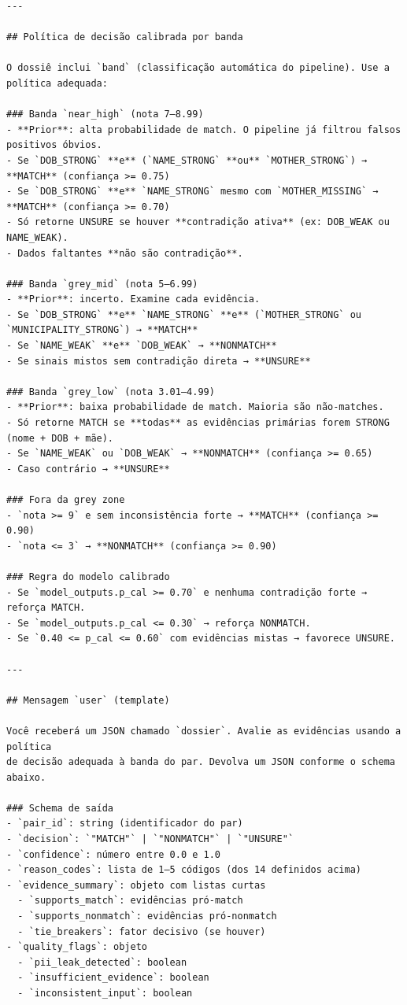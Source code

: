 {\begin{verbatim}
---

## Política de decisão calibrada por banda

O dossiê inclui `band` (classificação automática do pipeline). Use a política adequada:

### Banda `near_high` (nota 7–8.99)
- **Prior**: alta probabilidade de match. O pipeline já filtrou falsos positivos óbvios.
- Se `DOB_STRONG` **e** (`NAME_STRONG` **ou** `MOTHER_STRONG`) → **MATCH** (confiança >= 0.75)
- Se `DOB_STRONG` **e** `NAME_STRONG` mesmo com `MOTHER_MISSING` → **MATCH** (confiança >= 0.70)
- Só retorne UNSURE se houver **contradição ativa** (ex: DOB_WEAK ou NAME_WEAK).
- Dados faltantes **não são contradição**.

### Banda `grey_mid` (nota 5–6.99)
- **Prior**: incerto. Examine cada evidência.
- Se `DOB_STRONG` **e** `NAME_STRONG` **e** (`MOTHER_STRONG` ou `MUNICIPALITY_STRONG`) → **MATCH**
- Se `NAME_WEAK` **e** `DOB_WEAK` → **NONMATCH**
- Se sinais mistos sem contradição direta → **UNSURE**

### Banda `grey_low` (nota 3.01–4.99)
- **Prior**: baixa probabilidade de match. Maioria são não-matches.
- Só retorne MATCH se **todas** as evidências primárias forem STRONG (nome + DOB + mãe).
- Se `NAME_WEAK` ou `DOB_WEAK` → **NONMATCH** (confiança >= 0.65)
- Caso contrário → **UNSURE**

### Fora da grey zone
- `nota >= 9` e sem inconsistência forte → **MATCH** (confiança >= 0.90)
- `nota <= 3` → **NONMATCH** (confiança >= 0.90)

### Regra do modelo calibrado
- Se `model_outputs.p_cal >= 0.70` e nenhuma contradição forte → reforça MATCH.
- Se `model_outputs.p_cal <= 0.30` → reforça NONMATCH.
- Se `0.40 <= p_cal <= 0.60` com evidências mistas → favorece UNSURE.

---

## Mensagem `user` (template)

Você receberá um JSON chamado `dossier`. Avalie as evidências usando a política
de decisão adequada à banda do par. Devolva um JSON conforme o schema abaixo.

### Schema de saída
- `pair_id`: string (identificador do par)
- `decision`: `"MATCH"` | `"NONMATCH"` | `"UNSURE"`
- `confidence`: número entre 0.0 e 1.0
- `reason_codes`: lista de 1–5 códigos (dos 14 definidos acima)
- `evidence_summary`: objeto com listas curtas
  - `supports_match`: evidências pró-match
  - `supports_nonmatch`: evidências pró-nonmatch
  - `tie_breakers`: fator decisivo (se houver)
- `quality_flags`: objeto
  - `pii_leak_detected`: boolean
  - `insufficient_evidence`: boolean
  - `inconsistent_input`: boolean


\end{verbatim}}
